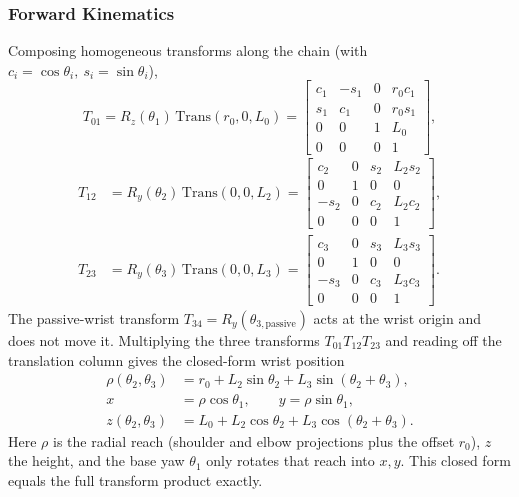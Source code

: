 \subsubsection{Forward Kinematics}\label{sec:fk}
Composing homogeneous transforms along the chain (with $c_i=\cos\theta_i,\ s_i=\sin\theta_i$),
\begin{equation}\label{eq:T01}
T_{01}=R_z(\theta_1)\,\mathrm{Trans}(r_0,0,L_0)=
\begin{bmatrix} c_1&-s_1&0&r_0c_1\\ s_1&c_1&0&r_0s_1\\ 0&0&1&L_0\\ 0&0&0&1\end{bmatrix},
\end{equation}
\begin{equation}\label{eq:T12}
\begin{aligned}
T_{12}&=R_y(\theta_2)\,\mathrm{Trans}(0,0,L_2)=
\begin{bmatrix} c_2&0&s_2&L_2s_2\\ 0&1&0&0\\ -s_2&0&c_2&L_2c_2\\ 0&0&0&1\end{bmatrix},\\[4pt]
T_{23}&=R_y(\theta_3)\,\mathrm{Trans}(0,0,L_3)=
\begin{bmatrix} c_3&0&s_3&L_3s_3\\ 0&1&0&0\\ -s_3&0&c_3&L_3c_3\\ 0&0&0&1\end{bmatrix}.
\end{aligned}
\end{equation}
The passive-wrist transform $T_{34}=R_y(\theta_{3,\text{passive}})$ acts at the wrist origin and does not move it. Multiplying the three transforms $T_{01}T_{12}T_{23}$ and reading off the translation column gives the closed-form wrist position
\begin{equation}\label{eq:fk}
\boxed{\;
\begin{aligned}
\rho(\theta_2,\theta_3)&=r_0+L_2\sin\theta_2+L_3\sin(\theta_2+\theta_3),\\
x&=\rho\cos\theta_1,\qquad y=\rho\sin\theta_1,\\
z(\theta_2,\theta_3)&=L_0+L_2\cos\theta_2+L_3\cos(\theta_2+\theta_3).
\end{aligned}\;}
\end{equation}
Here $\rho$ is the radial reach (shoulder and elbow projections plus the offset $r_0$), $z$ the height, and the base yaw $\theta_1$ only rotates that reach into $x,y$. This closed form equals the full transform product exactly.

